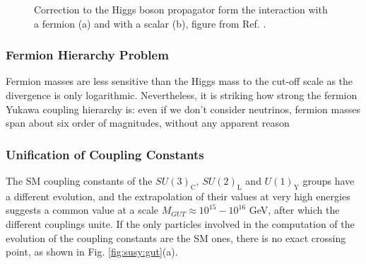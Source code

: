 \begin{figure}[ht]
\centering
{}
\caption{Correction to the Higgs boson propagator form the interaction with a fermion (a) and with a scalar (b), figure from Ref. \cite{Martin:1997ns}.}
\label{fig:sm:h_corr}
\end{figure}

\subsubsection*{Fermion Hierarchy Problem} 

Fermion masses are less sensitive than the Higgs mass to the cut-off scale as the divergence is only logarithmic. Nevertheless, it is striking how strong the fermion Yukawa coupling hierarchy is: even if we don't consider neutrinos, fermion masses span about six order of magnitudes, without any apparent reason

\subsubsection*{Unification of Coupling Constants}

The SM coupling constants of the $SU(3)_\mathrm{C}$, $SU(2)_\mathrm{L}$ and $U(1)_\mathrm{Y}$ groups have a different evolution, and the extrapolation of their values at very high energies suggests a common value at a scale $M_{GUT} \approx 10^{15}-10^{16}$ GeV, after which the different couplings unite. If the only particles involved in the computation of the evolution of the coupling constants are the SM ones, there is no exact crossing point, as shown in Fig. \ref{fig:susy:gut}(a).

